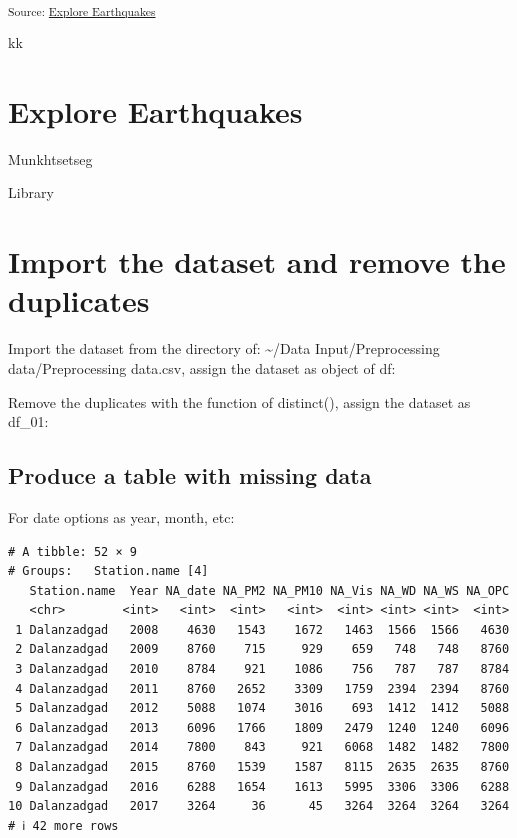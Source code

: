 \documentclass[
]{agujournal2019}
\begin{document}
\textsubscript{Source:
\href{https://EmouAcademy.github.io/my-awesome-manuscripts/notebooks/explore-earthquakes-preview.html\#cell-fig-spatial-plot}{Explore
Earthquakes}}

kk

\section{Explore Earthquakes}\label{explore-earthquakes}

Munkhtsetseg

Library

\section{Import the dataset and remove the
duplicates}\label{import-the-dataset-and-remove-the-duplicates-1}

Import the dataset from the directory of: \textasciitilde/Data
Input/Preprocessing data/Preprocessing data.csv, assign the dataset as
object of df:

Remove the duplicates with the function of distinct(), assign the
dataset as df\_01:

\subsection{Produce a table with missing
data}\label{produce-a-table-with-missing-data-1}

For date options as year, month, etc:

\begin{verbatim}
# A tibble: 52 × 9
# Groups:   Station.name [4]
   Station.name  Year NA_date NA_PM2 NA_PM10 NA_Vis NA_WD NA_WS NA_OPC
   <chr>        <int>   <int>  <int>   <int>  <int> <int> <int>  <int>
 1 Dalanzadgad   2008    4630   1543    1672   1463  1566  1566   4630
 2 Dalanzadgad   2009    8760    715     929    659   748   748   8760
 3 Dalanzadgad   2010    8784    921    1086    756   787   787   8784
 4 Dalanzadgad   2011    8760   2652    3309   1759  2394  2394   8760
 5 Dalanzadgad   2012    5088   1074    3016    693  1412  1412   5088
 6 Dalanzadgad   2013    6096   1766    1809   2479  1240  1240   6096
 7 Dalanzadgad   2014    7800    843     921   6068  1482  1482   7800
 8 Dalanzadgad   2015    8760   1539    1587   8115  2635  2635   8760
 9 Dalanzadgad   2016    6288   1654    1613   5995  3306  3306   6288
10 Dalanzadgad   2017    3264     36      45   3264  3264  3264   3264
# ℹ 42 more rows
\end{verbatim}
\end{document}
